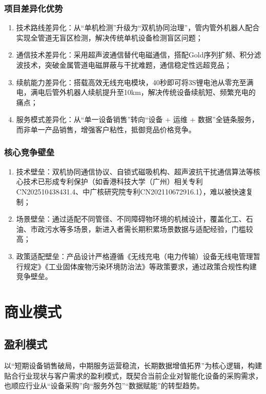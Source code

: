 \documentclass[12pt, a4paper]{article}
\let\oldsection\section
\renewcommand{\section}{\FloatBarrier\oldsection}
\begin{document}
\subsubsection{项目差异化优势}

\begin{enumerate}
    \item 技术路线差异化：从“单机检测”升级为“双机协同治理”，管内管外机器人配合实现全管道无盲区检测，解决传统单机设备检测盲区问题；
    \item 通信技术差异化：采用超声波通信替代电磁通信，搭配Gold序列扩频、积分滤波技术，突破金属管道电磁屏蔽与干扰难题，通信稳定性远超竞品；
    \item 续航能力差异化：搭载高效无线充电模块，40秒即可将3S锂电池从零充至满电，满电后管外机器人续航提升至10km，解决传统设备续航短、频繁充电的痛点；
    \item 服务模式差异化：从“单一设备销售”转向“设备 + 运维 + 数据”全链条服务，而非单一产品销售，增强客户粘性，抵御竞品价格竞争。
\end{enumerate}

\subsubsection{核心竞争壁垒}

\begin{enumerate}
    \item 技术壁垒：双机协同通信协议、自锁式磁吸机构、超声波抗干扰通信算法等核心技术已形成专利保护（如香港科技大学（广州）相关专利CN202510438431.4、中广核研究院专利CN202110672916.1），难以被快速复制；
    \item 场景壁垒：通过适配不同管径、不同障碍物环境的机械设计，覆盖化工、石油、市政污水等多场景，新进入者需长期积累场景数据与适配经验，门槛较高；
    \item 政策适配壁垒：产品设计严格遵循《无线充电（电力传输）设备无线电管理暂行规定》《工业固体废物污染环境防治法》等政策要求，通过政策合规性构建竞争壁垒。
\end{enumerate}

\section{商业模式}

\subsection{盈利模式}

以“短期设备销售破局，中期服务运营稳流，长期数据增值拓界”为核心逻辑，构建贴合行业现状与客户需求的盈利模式，既契合当前企业对智能化设备的采购需求，也顺应行业从“设备采购”向“服务外包”“数据赋能”的转型趋势。
\end{document}
